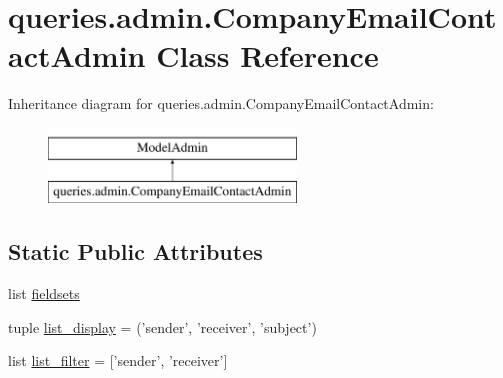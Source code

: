 \hypertarget{classqueries_1_1admin_1_1_company_email_contact_admin}{\section{queries.\-admin.\-Company\-Email\-Contact\-Admin Class Reference}
\label{classqueries_1_1admin_1_1_company_email_contact_admin}
}
Inheritance diagram for queries.\-admin.\-Company\-Email\-Contact\-Admin\-:\begin{figure}[H]
\begin{center}
\leavevmode
\includegraphics[height=2.000000cm]{classqueries_1_1admin_1_1_company_email_contact_admin}
\end{center}
\end{figure}
\subsection*{Static Public Attributes}
\begin{DoxyCompactItemize}
\item 
list \hyperlink{classqueries_1_1admin_1_1_company_email_contact_admin_ac8ece5196b38279d36a2d25d807c9865}{fieldsets}
\item 
tuple \hyperlink{classqueries_1_1admin_1_1_company_email_contact_admin_a1ee681d33eb8e3daaba7cfb1a1389336}{list\-\_\-display} = ('sender', 'receiver', 'subject')
\item 
list \hyperlink{classqueries_1_1admin_1_1_company_email_contact_admin_a81b9dece41d8b13566d9abb5d7efcae0}{list\-\_\-filter} = \mbox{[}'sender', 'receiver'\mbox{]}
\end{DoxyCompactItemize}


